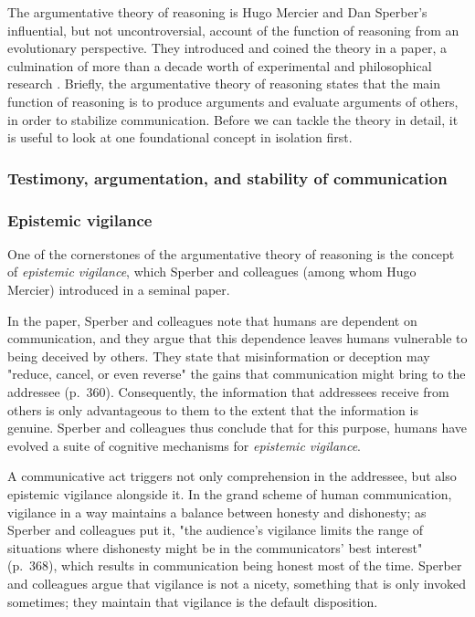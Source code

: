 The argumentative theory of reasoning is Hugo Mercier and Dan Sperber's influential, but not uncontroversial, account of the function of reasoning from an evolutionary perspective. They introduced and coined the theory in a \citeyear{MS11} paper, a culmination of more than a decade worth of experimental and philosophical research .
Briefly, the argumentative theory of reasoning states that the main function of reasoning is to produce arguments and evaluate arguments of others, in order to stabilize communication.
Before we can tackle the theory in detail, it is useful to look at one foundational concept in isolation first.

\subsubsection{Testimony, argumentation, and stability of communication}


\subsubsection{Epistemic vigilance}

One of the cornerstones of the argumentative theory of reasoning is the concept of \emph{epistemic vigilance}, which Sperber and colleagues (among whom Hugo Mercier) introduced in a seminal \citeyear{Sperber10} paper.

In the paper, Sperber and colleagues note that humans are dependent on communication, and they argue that this dependence leaves humans vulnerable to being deceived by others.
They state that misinformation or deception may "reduce, cancel, or even reverse" the gains that communication might bring to the addressee (p.~360).
Consequently, the information that addressees receive from others is only advantageous to them to the extent that the information is genuine.
Sperber and colleagues thus conclude that for this purpose, humans have evolved a suite of cognitive mechanisms for \emph{epistemic vigilance}.

A communicative act triggers not only comprehension in the addressee, but also epistemic vigilance alongside it.
In the grand scheme of human communication, vigilance in a way maintains a balance between honesty and dishonesty; as Sperber and colleagues put it, "the audience's vigilance limits the range of situations where dishonesty might be in the communicators' best interest" (p.~368), which results in communication being honest most of the time.
Sperber and colleagues argue that vigilance is not a nicety, something that is only invoked sometimes; they maintain that vigilance is the default disposition.

